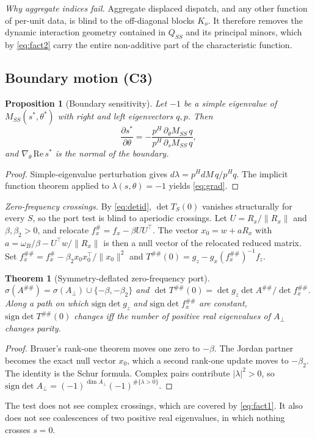 \documentclass[journal]{IEEEtran}
\newtheorem{theorem}{Theorem}
\newtheorem{proposition}{Proposition}
\theoremstyle{definition}
\theoremstyle{remark}
\newcommand{\Aperp}{A_{\perp}}
\begin{document}
\emph{Why aggregate indices fail.} Aggregate displaced dispatch, and any other
function of per-unit data, is blind to the off-diagonal blocks $K_o$. It
therefore removes the dynamic interaction geometry contained in $Q_{SS}$ and
its principal minors, which by \eqref{eq:fact2} carry the entire non-additive
part of the characteristic function.

\subsection{Boundary motion (C3)}
\begin{proposition}[Boundary sensitivity]\label{prop:gradient}
Let $-1$ be a simple eigenvalue of $M_{SS}(s^*,\theta^*)$ with right and left
eigenvectors $q,p$. Then
\begin{equation}\label{eq:grad}
\frac{\partial s^*}{\partial\theta}=
-\frac{p^{H}\,\partial_\theta M_{SS}\,q}{p^{H}\,\partial_s M_{SS}\,q},
\end{equation}
and $\nabla_\theta\,\mathrm{Re}\,s^*$ is the normal of the boundary.
\end{proposition}
\begin{proof}
Simple-eigenvalue perturbation gives $d\lambda=p^{H}dM\,q/p^{H}q$. The implicit
function theorem applied to $\lambda(s,\theta)=-1$ yields \eqref{eq:grad}.
\end{proof}

\emph{Zero-frequency crossings.} By \eqref{eq:detid}, $\det T_S(0)$ vanishes
structurally for every $S$, so the port test is blind to aperiodic crossings.
Let $U=R_x/\|R_x\|$ and $\beta,\beta_2>0$, and relocate
$f_x^{\#}=f_x-\beta UU^\top$. The vector $x_0=w+aR_x$ with
$a=\omega_B/\beta-U^\top w/\|R_x\|$ is then a null vector of the relocated
reduced matrix. Set $f_x^{\#\#}=f_x^{\#}-\beta_2x_0x_0^\top/\|x_0\|^2$ and
$T^{\#\#}(0)=g_z-g_x(f_x^{\#\#})^{-1}f_z$.

\begin{theorem}[Symmetry-deflated zero-frequency port]\label{thm:port}
$\sigma(A^{\#\#})=\sigma(\Aperp)\cup\{-\beta,-\beta_2\}$ and
$\det T^{\#\#}(0)=\det g_z\det A^{\#\#}/\det f_x^{\#\#}$. Along a path on which
$\mathrm{sign}\det g_z$ and $\mathrm{sign}\det f_x^{\#\#}$ are constant,
$\mathrm{sign}\det T^{\#\#}(0)$ changes iff the number of positive real
eigenvalues of $\Aperp$ changes parity.
\end{theorem}
\begin{proof}
Brauer's rank-one theorem \cite{brauer1952} moves one zero to $-\beta$. The
Jordan partner becomes the exact null vector $x_0$, which a second rank-one
update moves to $-\beta_2$. The identity is the Schur formula. Complex pairs
contribute $|\lambda|^2>0$, so
$\mathrm{sign}\det\Aperp=(-1)^{\dim\Aperp}(-1)^{\#\{\lambda>0\}}$.
\end{proof}
The test does not see complex crossings, which are covered by \eqref{eq:fact1}.
It also does not see coalescences of two positive real eigenvalues, in which
nothing crosses $s=0$.
\end{document}
